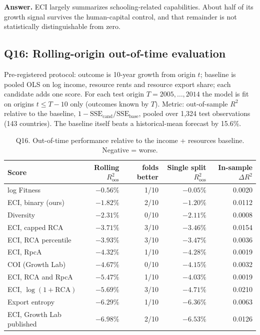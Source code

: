 \documentclass[11pt]{article}
\begin{document}
\textbf{Answer.} ECI largely summarizes schooling-related capabilities. About half of its growth signal survives the human-capital control, and that remainder is not statistically distinguishable from zero.

\subsection{Q16: Rolling-origin out-of-time evaluation}\label{sec:q16}

Pre-registered protocol: outcome is 10-year growth from origin $t$; baseline is pooled OLS on log income, resource rents and resource export share; each candidate adds one score. For each test origin $T=2005,\dots,2014$ the model is fit on origins $t\le T-10$ only (outcomes known by $T$). Metric: out-of-sample $R^2$ relative to the baseline, $1-\text{SSE}_\text{cand}/\text{SSE}_\text{base}$, pooled over 1,324 test observations (143 countries). The baseline itself beats a historical-mean forecast by 15.6\%.

\begin{table}[H]\centering\small
\caption{Q16. Out-of-time performance relative to the income + resources baseline. Negative = worse.}\label{tab:q16}
\begin{tabular}{lrrrr}
\toprule
Score & Rolling $R^2_\text{oos}$ & folds better & Single split $R^2_\text{oos}$ & In-sample $\Delta R^2$ \\
\midrule
log Fitness & $-0.56\%$ & 1/10 & $-0.05\%$ & 0.0020 \\
ECI, binary (ours) & $-1.82\%$ & 2/10 & $-1.20\%$ & 0.0112 \\
Diversity & $-2.31\%$ & 0/10 & $-2.11\%$ & 0.0008 \\
ECI, capped RCA & $-3.71\%$ & 3/10 & $-3.46\%$ & 0.0154 \\
ECI, RCA percentile & $-3.93\%$ & 3/10 & $-3.47\%$ & 0.0036 \\
ECI, RpcA & $-4.32\%$ & 1/10 & $-4.28\%$ & 0.0019 \\
COI (Growth Lab) & $-4.67\%$ & 0/10 & $-4.15\%$ & 0.0032 \\
ECI, RCA and RpcA & $-5.47\%$ & 1/10 & $-4.03\%$ & 0.0019 \\
ECI, $\log(1+\text{RCA})$ & $-5.69\%$ & 3/10 & $-4.71\%$ & 0.0210 \\
Export entropy & $-6.29\%$ & 1/10 & $-6.36\%$ & 0.0063 \\
ECI, Growth Lab published & $-6.98\%$ & 2/10 & $-6.53\%$ & 0.0126 \\
\bottomrule
\end{tabular}
\end{table}
\end{document}
